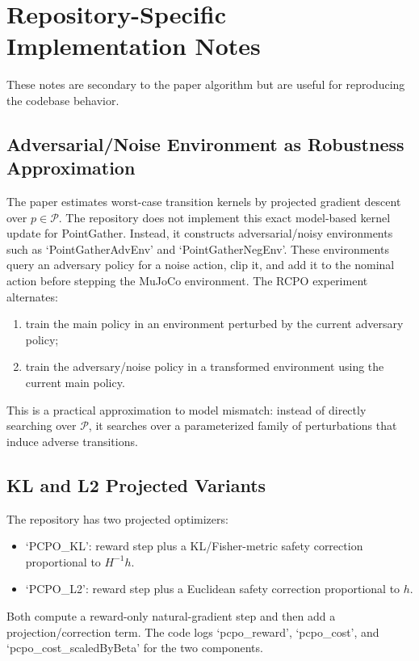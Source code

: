 \documentclass[11pt]{article}
\newcommand{\Pset}{\mathcal P}
\begin{document}
\section{Repository-Specific Implementation Notes}
These notes are secondary to the paper algorithm but are useful for reproducing the codebase behavior.

\subsection{Adversarial/Noise Environment as Robustness Approximation}
The paper estimates worst-case transition kernels by projected gradient descent over $p\in\Pset$.  The repository does not implement this exact model-based kernel update for PointGather.  Instead, it constructs adversarial/noisy environments such as `PointGatherAdvEnv' and `PointGatherNegEnv'.  These environments query an adversary policy for a noise action, clip it, and add it to the nominal action before stepping the MuJoCo environment.  The RCPO experiment alternates:
\begin{enumerate}[leftmargin=2em]
    \item train the main policy in an environment perturbed by the current adversary policy;
    \item train the adversary/noise policy in a transformed environment using the current main policy.
\end{enumerate}
This is a practical approximation to model mismatch: instead of directly searching over $\Pset$, it searches over a parameterized family of perturbations that induce adverse transitions.

\subsection{KL and L2 Projected Variants}
The repository has two projected optimizers:
\begin{itemize}[leftmargin=2em]
    \item `PCPO\_KL': reward step plus a KL/Fisher-metric safety correction proportional to $H^{-1}h$.
    \item `PCPO\_L2': reward step plus a Euclidean safety correction proportional to $h$.
\end{itemize}
Both compute a reward-only natural-gradient step and then add a projection/correction term.  The code logs `pcpo\_reward', `pcpo\_cost', and `pcpo\_cost\_scaledByBeta' for the two components.
\end{document}
